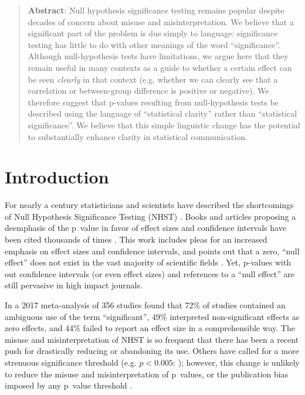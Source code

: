 \begin{abstract}

\textbf{Abstract}: Null hypothesis significance testing remains popular despite decades of concern about misuse and misinterpretation. We believe that a significant part of the problem is due simply to language: significance testing has little to do with other meanings of the word ``significance''. Although null-hypothesis tests have limitations, we argue here that they remain useful in many contexts as a guide to whether a certain effect can be seen \emph{clearly} in that context (e.g. whether we can clearly see that a correlation or between-group difference is positive or negative). We therefore suggest that p-values resulting from null-hypothesis tests be described using the language of ``statistical clarity'' rather than ``statistical significance''. We believe that this simple linguistic change has the potential to substantially enhance clarity in statistical communication.

\end{abstract}

\flushbottom
\maketitle
\newpage
\thispagestyle{empty}

\clearpage

\section*{Introduction}

For nearly a century statisticians and scientists have described the shortcomings of Null Hypothesis Significance Testing (NHST) \citep[see][]{Cohen1994}.
Books and articles proposing a deemphasis of the p~value in favor of effect sizes and confidence intervals have been cited thousands of times \citep{Cohen1994, Goodman1999, Wilkinson1999, ZiliakandMcCloskey2008, WassersteinandLazar2016}. This work includes pleas for an increased emphasis on effect sizes and confidence intervals, and points out that a zero, ``null effect'' does not exist in the vast majority of scientific fields \citep{Meehl1990, Tukey1991, Cohen1994}. Yet, p-values with out confidence intervals (or even effect sizes) and references to a ``null effect'' are still pervasive in high impact journals. 

In a 2017 meta-analysis of 356 studies \citet{Bernardietal.2017} found that 72\% of studies contained an ambiguous use of the term ``significant'', 49\% interpreted non-significant effects as zero effects, and 44\% failed to report an effect size in a comprehensible way. The misuse and misinterpretation of NHST is so frequent that there has been a recent push for drastically reducing \citep{SzucsandIoannidis2017} or abandoning \citep{McShaneetal.2017} its use. Others have called for a more strenuous significance threshold (e.g. $p < 0.005$: \citealt{Benjaminetal.2018}); however, this change is unlikely to reduce the misuse and misinterpretation of p~values, or the publication bias imposed by any p~value threshold \citep{Ridleyetal.2007}.

